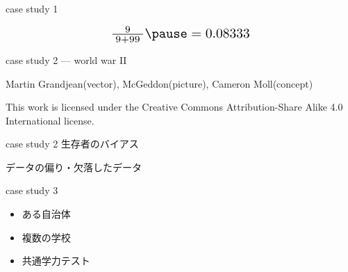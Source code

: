 \documentclass[
  ignorenonframetext,
  aspectratio=169]{beamer}
\begin{document}
\begin{frame}{case study 1}
\protect\hypertarget{case-study-1-5}{}
\begin{center}\Huge               
\[
 \scalebox{1.4}{$\frac{9}{\;9 + 99\;}\pause
 =0.08333$}
\]
\end{center}
\end{frame}

\begin{frame}{}
\protect\hypertarget{section-2}{}
\Huge

\scalebox{1.4}{\textcolor{softblue}{事例2}}
\end{frame}

\begin{frame}{case study 2 --- world war II}
\protect\hypertarget{case-study-2-world-war-ii}{}
\raggedleft


\tiny

\raggedleft

Martin Grandjean(vector), McGeddon(picture), Cameron Moll(concept)

\vspace{-5pt}

This work is licensed under the Creative Commons Attribution-Share Alike
4.0 International license.

\pause

\Huge
\vspace{-120pt}

\vspace{-130pt}
\end{frame}

\begin{frame}{case study 2 生存者のバイアス}
\protect\hypertarget{case-study-2-ux751fux5b58ux8005ux306eux30d0ux30a4ux30a2ux30b9}{}
\LARGE

データの偏り・欠落したデータ
\end{frame}

\begin{frame}{}
\protect\hypertarget{section-3}{}
\Huge

\scalebox{1.4}{\textcolor{softblue}{事例3}}
\end{frame}

\begin{frame}{case study 3}
\protect\hypertarget{case-study-3}{}
\Huge

\begin{itemize}
\item[\textbullet] ある自治体
\item[\textbullet] 複数の学校
\item[\textbullet] 共通学力テスト
\end{itemize}
\end{frame}
\end{document}
